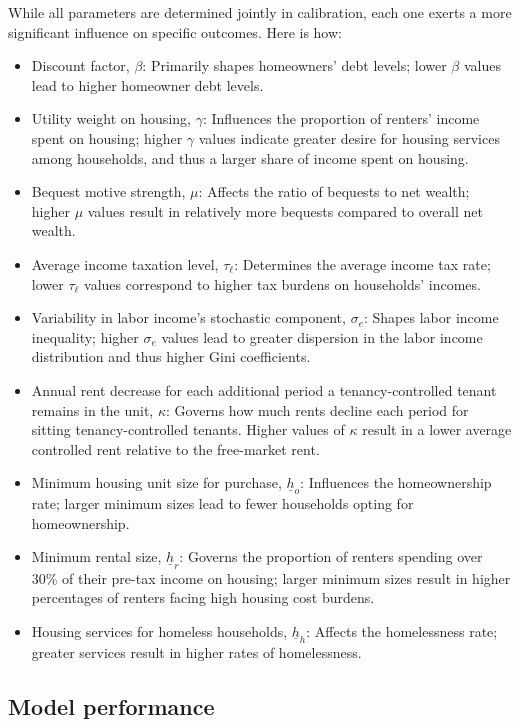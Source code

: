 \documentclass[parskip=full]{article}
\begin{document}
While all parameters are determined jointly in calibration, each one exerts a more significant influence on specific outcomes. Here is how:
\begin{itemize}
    \item Discount factor, $\beta$: Primarily shapes homeowners' debt levels; lower $\beta$ values lead to higher homeowner debt levels.
    \item Utility weight on housing, $\gamma$: Influences the proportion of renters' income spent on housing; higher $\gamma$ values indicate greater desire for housing services among households, and thus a larger share of income spent on housing.
    \item Bequest motive strength, $\mu$: Affects the ratio of bequests to net wealth; higher $\mu$ values result in relatively more bequests compared to overall net wealth.
    \item Average income taxation level, $\tau_{\ell}$: Determines the average income tax rate; lower $\tau_{\ell}$ values correspond to higher tax burdens on households' incomes.
    \item Variability in labor income's stochastic component, $\sigma_{e}$: Shapes labor income inequality; higher $\sigma_{e}$ values lead to greater dispersion in the labor income distribution and thus higher Gini coefficients.
    \item Annual rent decrease for each additional period a tenancy-controlled tenant remains in the unit, $\kappa$: Governs how much rents decline each period for sitting tenancy-controlled tenants. Higher values of $\kappa$ result in a lower average controlled rent relative to the free-market rent.
    \item Minimum housing unit size for purchase, $\underline{h}_{o}$: Influences the homeownership rate; larger minimum sizes lead to fewer households opting for homeownership.
    \item Minimum rental size, $\underline{h}_{r}$: Governs the proportion of renters spending over 30\% of their pre-tax income on housing; larger minimum sizes result in higher percentages of renters facing high housing cost burdens.
    \item Housing services for homeless households, $\underline{h}_{h}$: Affects the homelessness rate; greater services result in higher rates of homelessness.
\end{itemize}

\subsection{Model performance}\label{sec:non_targeted_statistics}
\end{document}
